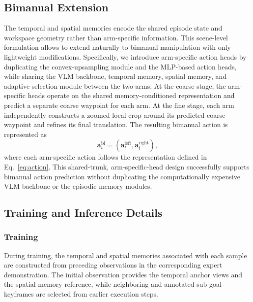 \subsection{Bimanual Extension}
\label{sec:memmethod:bimanual}

The temporal and spatial memories encode the shared episode state and
workspace geometry rather than arm-specific information.
This scene-level formulation allows \memmethod to extend naturally to
bimanual manipulation with only lightweight modifications.
Specifically, we introduce arm-specific action heads by duplicating the
convex-upsampling module and the MLP-based action heads, while sharing the VLM backbone, temporal memory, spatial memory, and adaptive selection module between the two arms.
At the coarse stage, the arm-specific heads operate on the shared
memory-conditioned representation and predict a separate coarse waypoint
for each arm.
At the fine stage, each arm independently constructs a zoomed local crop
around its predicted coarse waypoint and refines its final translation.
The resulting bimanual action is represented as
\begin{equation}
    \mathbf{a}^{\mathrm{bi}}_t
    =
    \left(
        \mathbf{a}^{\mathrm{left}}_t,
        \mathbf{a}^{\mathrm{right}}_t
    \right),
    \label{eq:bimanual_action}
\end{equation}
where each arm-specific action follows the representation defined in
Eq.~\eqref{eq:action}.
This shared-trunk, arm-specific-head design successfully supports bimanual action prediction without duplicating the computationally expensive VLM backbone or the episodic memory modules.

\subsection{Training and Inference Details}
\label{sec:memmethod:training}

\subsubsection{Training}

During training, the temporal and spatial memories associated with each
sample are constructed from preceding observations in the corresponding
expert demonstration.
The initial observation provides the temporal anchor views and the spatial memory reference, while neighboring and annotated sub-goal keyframes are
selected from earlier execution steps.

